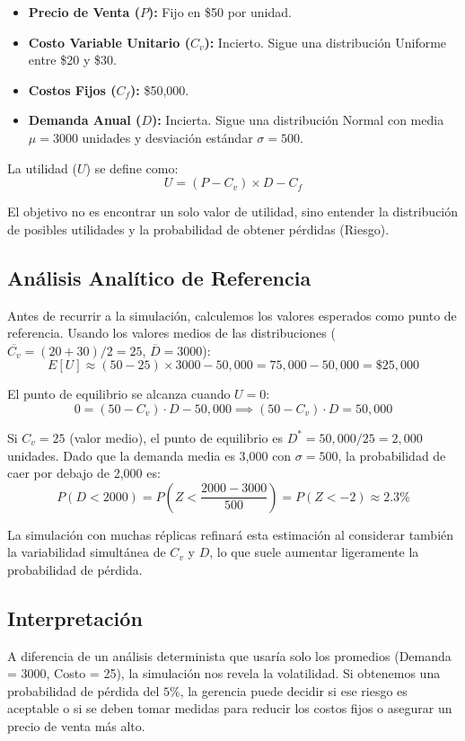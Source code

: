 \documentclass[11pt, letterpaper]{article}
\begin{document}
\begin{itemize}
    \item \textbf{Precio de Venta ($P$):} Fijo en \$50 por unidad.
    \item \textbf{Costo Variable Unitario ($C_v$):} Incierto. Sigue una distribución Uniforme entre \$20 y \$30.
    \item \textbf{Costos Fijos ($C_f$):} \$50,000.
    \item \textbf{Demanda Anual ($D$):} Incierta. Sigue una distribución Normal con media $\mu = 3000$ unidades y desviación estándar $\sigma = 500$.
\end{itemize}

La utilidad ($U$) se define como:
\begin{equation}
    U = (P - C_v) \times D - C_f
\end{equation}

El objetivo no es encontrar un solo valor de utilidad, sino entender la distribución de posibles utilidades y la probabilidad de obtener pérdidas (Riesgo).

\subsection{Análisis Analítico de Referencia}
Antes de recurrir a la simulación, calculemos los valores esperados como punto de referencia. Usando los valores medios de las distribuciones ($\overline{C_v} = (20+30)/2 = 25$, $\overline{D} = 3000$):
\[ E[U] \approx (50 - 25) \times 3000 - 50{,}000 = 75{,}000 - 50{,}000 = \$25{,}000 \]

El punto de equilibrio se alcanza cuando $U = 0$:
\[ 0 = (50 - C_v) \cdot D - 50{,}000 \implies (50 - C_v) \cdot D = 50{,}000 \]

Si $C_v = 25$ (valor medio), el punto de equilibrio es $D^* = 50{,}000/25 = 2{,}000$ unidades. Dado que la demanda media es 3{,}000 con $\sigma = 500$, la probabilidad de caer por debajo de 2{,}000 es:
\[ P(D < 2000) = P\!\left(Z < \frac{2000-3000}{500}\right) = P(Z < -2) \approx 2.3\% \]

La simulación con muchas réplicas refinará esta estimación al considerar también la variabilidad simultánea de $C_v$ y $D$, lo que suele aumentar ligeramente la probabilidad de pérdida.

\subsection{Interpretación}
A diferencia de un análisis determinista que usaría solo los promedios (Demanda = 3000, Costo = 25), la simulación nos revela la volatilidad. Si obtenemos una probabilidad de pérdida del $5\%$, la gerencia puede decidir si ese riesgo es aceptable o si se deben tomar medidas para reducir los costos fijos o asegurar un precio de venta más alto.
\end{document}
